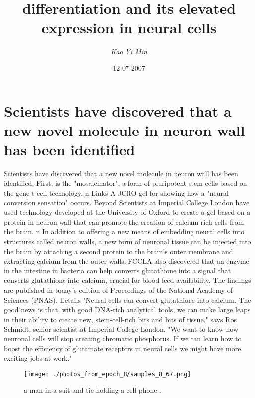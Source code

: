 \documentclass{article}%
\title{differentiation and its elevated expression in neural cells}%
\author{\textit{Kao Yi Min}}%
\date{12-07-2007}%
\begin{document}
%
\normalsize%
\maketitle%
\section{Scientists have discovered that a new novel molecule in neuron wall has been identified}%
\label{sec:Scientistshavediscoveredthatanewnovelmoleculeinneuronwallhasbeenidentified}%
Scientists have discovered that a new novel molecule in neuron wall has been identified. First, is the "mosaicinator", a form of pluripotent stem cells based on the gene t{-}cell technology. n\newline%
Links\newline%
A JCRO gel for showing how a "neural conversion sensation" occurs.\newline%
Beyond\newline%
Scientists at Imperial College London have used technology developed at the University of Oxford to create a gel based on a protein in neuron wall that can promote the creation of calcium{-}rich cells from the brain. n\newline%
In addition to offering a new means of embedding neural cells into structures called neuron walls, a new form of neuronal tissue can be injected into the brain by attaching a second protein to the brain's outer membrane and extracting calcium from the outer walls.\newline%
FCCLA also discovered that an enzyme in the intestine in bacteria can help converts glutathione into a signal that converts glutathione into calcium, crucial for blood feed availability.\newline%
The findings are published in today's edition of Proceedings of the National Academy of Sciences (PNAS).\newline%
Details\newline%
"Neural cells can convert glutathione into calcium. The good news is that, with good DNA{-}rich analytical tools, we can make large leaps in their ability to create new, stem{-}cell{-}rich bits and bits of tissue." says Ros Schmidt, senior scientist at Imperial College London. "We want to know how neuronal cells will stop creating chromatic phosphorus. If we can learn how to boost the efficiency of glutamate receptors in neural cells we might have more exciting jobs at work."\newline%

%


\begin{figure}[h!]%
\centering%
\texttt{[image: ./photos\_from\_epoch\_8/samples\_8\_67.png]}%
\caption{a man in a suit and tie holding a cell phone .}%
\end{figure}

%
\end{document}
